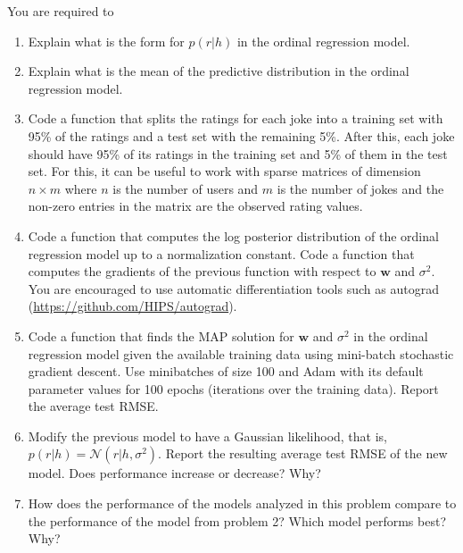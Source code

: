 \documentclass{harvardml}
\theoremstyle{plain}
\begin{document}
\begin{problem} You are required to
\begin{enumerate}
\vspace{-0.1cm}
\item Explain what is the form for $p(r|h)$ in the ordinal regression model.

\vspace{-0.1cm}
\item Explain what is the mean of the predictive distribution in the ordinal regression model.

\vspace{-0.1cm}
\item Code a function that splits the ratings for each joke into a training set
with 95\% of the ratings and a test set with the remaining 5\%.  After this,
each joke should have 95\% of its ratings in the training set and 5\% of them
in the test set. For this, it can be useful to work with sparse matrices of dimension $n\times
m$ where $n$ is the number of users and $m$ is the number of jokes and the
non-zero entries in the matrix are the observed rating values.

\vspace{-0.1cm}
\item Code a function that computes the log posterior distribution of the ordinal
regression model up to a normalization constant. Code a function that computes
the gradients of the previous function with respect to $\mathbf{w}$ and
$\sigma^2$. You are encouraged to use automatic differentiation tools such as autograd
(\url{https://github.com/HIPS/autograd}).

\vspace{-0.1cm}
\item Code a function that finds the MAP solution for $\mathbf{w}$ and
$\sigma^2$ in the ordinal regression model given the available training data using mini-batch stochastic
gradient descent. Use minibatches of size 100 and Adam with its default
parameter values for 100 epochs (iterations over the training data). Report the
average test RMSE.

\vspace{-0.1cm}
\item Modify the previous model to have a Gaussian likelihood, that is, $p(r|h)=\mathcal{N}(r|h,\sigma^2)$.
Report the resulting average test RMSE of the new model. Does performance
increase or decrease? Why?
\vspace{-0.1cm}
\item How does the performance of the models analyzed in this problem compare to
the performance of the model from problem 2? Which model performs best? Why?
\end{enumerate}
\end{problem}
\end{document}
